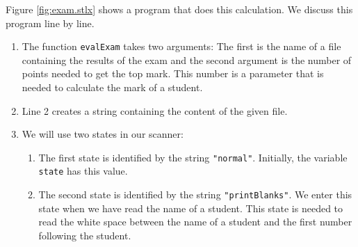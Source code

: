 Figure \ref{fig:exam.stlx} shows a program that does this calculation.  We discuss this
program line by line.
\begin{enumerate}
\item The function \texttt{evalExam} takes two arguments:  The first is the name of a file
      containing the results of the exam and the second argument is the number of points 
      needed to get the top mark.  This number is a parameter that is needed to calculate
      the mark of a student.
\item Line 2 creates a string containing the content of the given file.
\item We will use two states in our scanner:
      \begin{enumerate}
      \item The first state is identified by the string \texttt{"normal"}.
            Initially, the variable \texttt{state} has this value.
      \item The second state is identified by the string \texttt{"printBlanks"}. 
            We enter this state when we have read the name of a student.
            This state is needed to read the white space between the name of a student 
            and the first number following the student.


\end{enumerate}
\end{enumerate}
